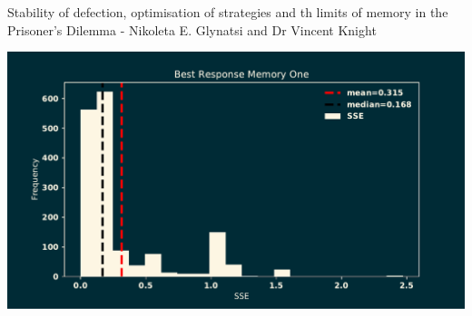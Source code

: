 \documentclass{beamer}
\begin{document}
\begin{frame}
    \begin{center}

        \normalsize{Stability of defection, optimisation of strategies and th
        limits of memory in the Prisoner's Dilemma - Nikoleta E. Glynatsi and
        Dr Vincent Knight}
        
        \vspace{.5cm}
        
    \end{center}
\end{frame}


\begin{frame}
    \begin{center}
        \includegraphics[width=\textwidth]{static/result_best_response}
    \end{center}
\end{frame}

\begin{frame}
    \begin{center}
        \hspace{-2cm}
        
    \end{center}
\end{frame}
\end{document}

